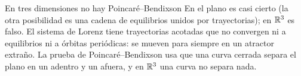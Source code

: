 \begin{trampa}[label=tr:oc-pb3d]{En tres dimensiones no hay Poincaré--Bendixson}
En el plano es casi cierto (la otra posibilidad es una cadena de equilibrios unidos por trayectorias); en $\mathbb{R}^3$ es falso. El sistema de Lorenz \citep{Lor63} tiene trayectorias acotadas que no convergen ni a equilibrios ni a órbitas periódicas: se mueven para siempre en un atractor extraño. La prueba de Poincaré--Bendixson usa que una curva cerrada separa el plano en un adentro y un afuera, y en $\mathbb{R}^3$ una curva no separa nada.
\end{trampa}
